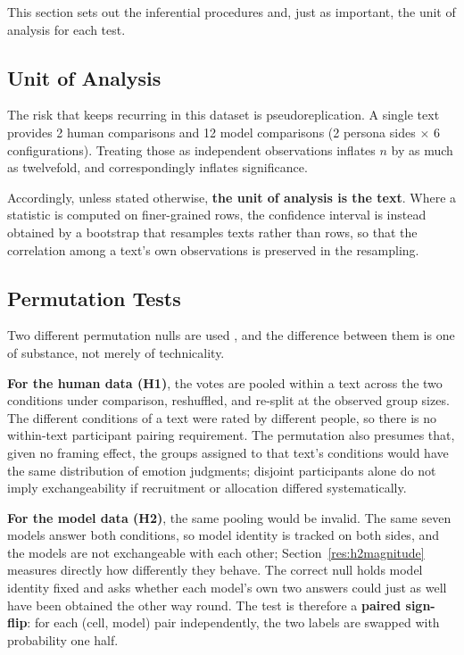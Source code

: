 \noindent
This section sets out the inferential procedures and, just as important, the unit of analysis for
each test.

\subsection{Unit of Analysis}
\label{impl:unit}

\noindent
The risk that keeps recurring in this dataset is pseudoreplication. A single text provides 2
human comparisons and 12 model comparisons (2 persona sides $\times$ 6 configurations). Treating
those as independent observations inflates $n$ by as much as twelvefold, and correspondingly
inflates significance.

Accordingly, unless stated otherwise, \textbf{the unit of analysis is the text}. Where a statistic
is computed on finer-grained rows, the confidence interval is instead obtained by a bootstrap that resamples
texts rather than rows, so that the correlation among a text's own observations is preserved in
the resampling.

\subsection{Permutation Tests}
\label{impl:permutation}

\noindent
Two different permutation nulls are used \cite{Good2005Permutation}, and the difference between
them is one of substance, not merely of technicality.

\textbf{For the human data (H1)}, the votes are pooled within a text across the two conditions
under comparison, reshuffled, and re-split at the observed group sizes. The different conditions
of a text were rated by different people, so there is no within-text participant pairing
requirement. The permutation also presumes that, given no framing effect, the groups assigned to
that text's conditions would have the same distribution of emotion judgments; disjoint
participants alone do not imply exchangeability if recruitment or allocation differed
systematically.

\textbf{For the model data (H2)}, the same pooling would be invalid. The same seven models answer
both conditions, so model identity is tracked on both sides, and the models are not exchangeable
with each other; Section~\ref{res:h2magnitude} measures directly how differently they behave. The
correct null holds model identity fixed and asks whether each model's own two answers could just
as well have been obtained the other way round. The test is therefore a \textbf{paired sign-flip}: for
each (cell, model) pair independently, the two labels are swapped with probability one half.

